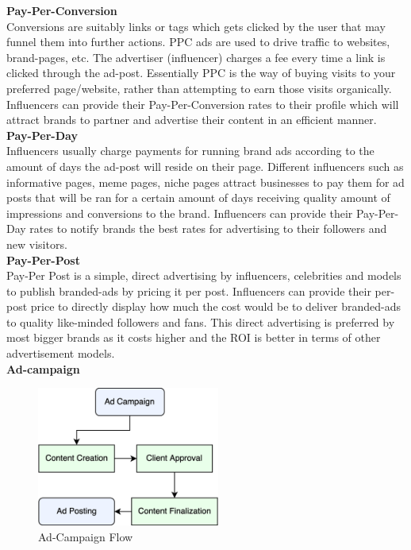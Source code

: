 \documentclass[10pt]{article}
\begin{document}
\textbf{Pay-Per-Conversion}\\

Conversions are suitably links or tags which gets clicked by the user that may funnel them into further actions. PPC ads are used to drive traffic to websites, brand-pages, etc. The advertiser (influencer) charges a fee every time a link is clicked through the ad-post. Essentially PPC is the way of buying visits to your preferred page/website, rather than attempting to earn those visits organically. Influencers can provide their Pay-Per-Conversion rates to their profile which will attract brands to partner and advertise their content in an efficient manner.\\ 

\textbf{Pay-Per-Day}\\

Influencers usually charge payments for running brand ads according to the amount of days the ad-post will reside on their page. Different influencers such as informative pages, meme pages, niche pages attract businesses to pay them for ad posts that will be ran for a certain amount of days receiving quality amount of impressions and conversions to the brand. Influencers can provide their Pay-Per-Day rates to notify brands the best rates for advertising to their followers and new visitors.\\

\textbf{Pay-Per-Post}\\

Pay-Per Post is a simple, direct advertising by influencers, celebrities and models to publish branded-ads by pricing it per post. Influencers can provide their per-post price to directly display how much the cost would be to deliver branded-ads to quality like-minded followers and fans. This direct advertising is preferred by most bigger brands as it costs higher and the ROI is better in terms of other advertisement models.\\

\textbf{Ad-campaign}\\

\begin{figure}[H]
\begin{center}
\includegraphics[width=6cm]{ad-flow}
\caption{Ad-Campaign Flow}
\end{center}
\end{figure}
\end{document}

